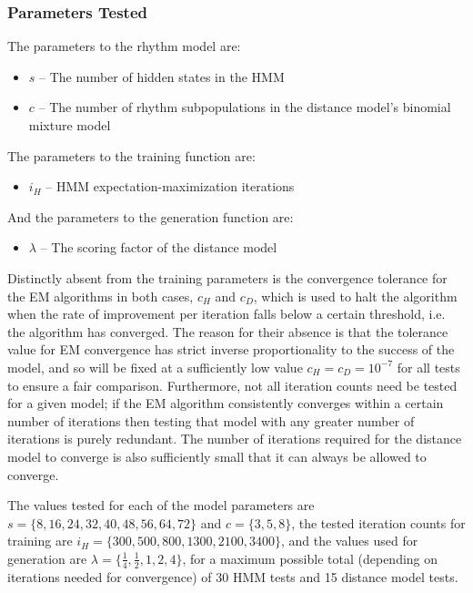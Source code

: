 \documentclass[ author={Stephen Livermore-Tozer},
				supervisor={Dr. Peter Flach},
				degree={MEng},
				title={Algorithmic Co-composition Using Machine Learning},
				subtitle={},
				type={research},
				year={2016} ]{dissertation}
\begin{document}
	\subsubsection{Parameters Tested}
	
	The parameters to the rhythm model are:
	\begin{itemize}
		\item $s$ -- The number of hidden states in the HMM
		\item $c$ -- The number of rhythm subpopulations in the distance model's binomial mixture model
	\end{itemize}
	The parameters to the training function are:
	\begin{itemize}
		\item $i_H$ -- HMM expectation-maximization iterations
	\end{itemize}
	And the parameters to the generation function are:
	\begin{itemize}
		\item $\lambda$ -- The scoring factor of the distance model
	\end{itemize}
	
	Distinctly absent from the training parameters is the convergence tolerance for the EM algorithms in both cases, $c_H$ and $c_D$, which is used to halt the algorithm when the rate of improvement per iteration falls below a certain threshold, i.e. the algorithm has converged. The reason for their absence is that the tolerance value for EM convergence has strict inverse proportionality to the success of the model, and so will be fixed at a sufficiently low value $c_H = c_D = 10^{-7}$ for all tests to ensure a fair comparison. Furthermore, not all iteration counts need be tested for a given model; if the EM algorithm consistently converges within a certain number of iterations then testing that model with any greater number of iterations is purely redundant. The number of iterations required for the distance model to converge is also sufficiently small that it can always be allowed to converge. 
	
	The values tested for each of the model parameters are $s = \{8,16,24,32,40,48,56,64,72\}$ and $c = \{3,5,8\}$, the tested iteration counts for training are $i_H = \{300, 500, 800, 1300, 2100, 3400\}$, and the values used for generation are $\lambda = \{\frac{1}{4},\frac{1}{2},1,2,4\}$, for a maximum possible total (depending on iterations needed for convergence) of 30 HMM tests and 15 distance model tests.
	
	
\end{document}
